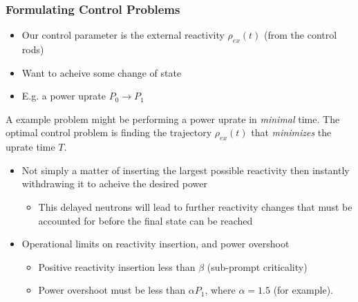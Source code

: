 \documentclass[10pt,compress]{beamer}
\begin{document}
\begin{frame}\frametitle{Formulating Control Problems}
    \begin{itemize}
        \item Our control parameter is the external reactivity $\rho_{ex}(t)$ (from the control rods)
        \item Want to acheive some change of state
        \item E.g. a power uprate $P_0\to P_1$
    \end{itemize}
    A example problem might be performing a power uprate in \emph{minimal} time. The optimal control problem is finding
    the trajectory $\rho_{ex}(t)$ that \emph{minimizes} the uprate time $T$.
    \begin{itemize}
        \item Not simply a matter of inserting the largest possible reactivity then instantly withdrawing it to acheive the desired power
            \begin{itemize}
                \item This delayed neutrons will lead to further reactivity changes that must be accounted for before the final state can
                be reached
            \end{itemize}
        \item Operational limits on reactivity insertion, and power overshoot
            \begin{itemize}
                \item Positive reactivity insertion less than $\beta$ (sub-prompt criticality)
                \item Power overshoot must be less than $\alpha P_1$, where $\alpha= 1.5$ (for example).
            \end{itemize}
    \end{itemize}
\end{frame}
\end{document}
